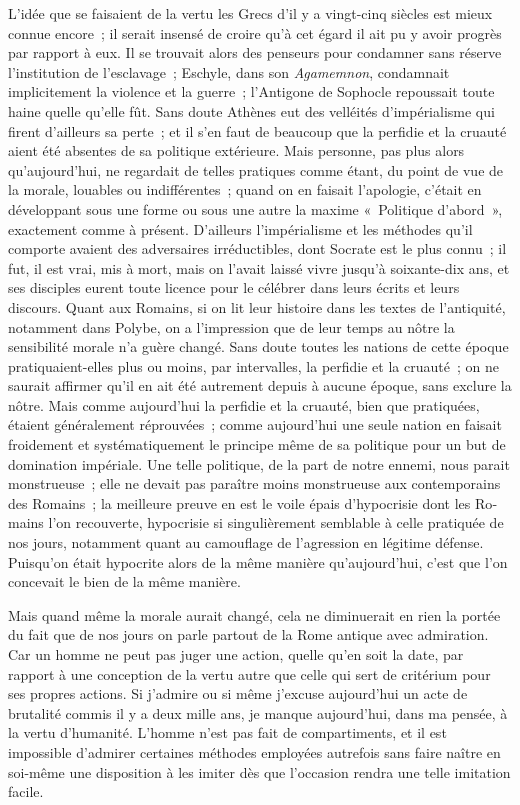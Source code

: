 \documentclass[french,twoside]{book} %
\begin{document}
L'idée que se faisaient de la vertu les Grecs d'il y a vingt-cinq siècles est mieux connue encore ; il serait insensé de croire qu'à cet égard il ait pu y avoir progrès par rapport à eux. Il se trouvait alors des penseurs pour condamner sans réserve l'institution de l'esclavage ; Eschyle, dans son {\itshape Agamemnon}, con­damnait implicitement la violence et la guerre ; l'Antigone de Sophocle repoussait toute haine quelle qu'elle fût. Sans doute Athènes eut des velléités d'impérialisme qui firent d'ailleurs sa perte ; et il s'en faut de beaucoup que la perfidie et la cruauté aient été absentes de sa politique extérieure. Mais per­sonne, pas plus alors qu'aujourd'hui, ne regardait de telles pratiques comme étant, du point de vue de la morale, louables ou indifférentes ; quand on en faisait l'apologie, c'était en développant sous une forme ou sous une autre la maxime « Politique d'abord », exactement comme à présent. D'ailleurs l'impé­rialisme et les méthodes qu'il comporte avaient des adversaires irréductibles, dont Socrate est le plus connu ; il fut, il est vrai, mis à mort, mais on l'avait laissé vivre jusqu'à soixante-dix ans, et ses disciples eurent toute licence pour le célébrer dans leurs écrits et leurs discours. Quant aux Romains, si on lit leur histoire dans les textes de l'antiquité, notamment dans Polybe, on a l'impres­sion que de leur temps au nôtre la sensibilité morale n'a guère changé. Sans doute toutes les nations de cette époque pratiquaient-elles plus ou moins, par intervalles, la perfidie et la cruauté ; on ne saurait affirmer qu'il en ait été autrement depuis à aucune époque, sans exclure la nôtre. Mais comme aujourd'hui la perfidie et la cruauté, bien que pratiquées, étaient généralement réprouvées ; comme aujourd'hui une seule nation en faisait froidement et systématiquement le principe même de sa politique pour un but de domination impériale. Une telle politique, de la part de notre ennemi, nous parait mons­trueuse ; elle ne devait pas paraître moins monstrueuse aux contemporains des Romains ; la meilleure preuve en est le voile épais d'hypocrisie dont les Ro­mains l'on recouverte, hypocrisie si singulièrement semblable à celle pratiquée de nos jours, notamment quant au camouflage de l'agression en légitime défense. Puisqu'on était hypocrite alors de la même manière qu'aujourd'hui, c'est que l'on concevait le bien de la même manière.\par
Mais quand même la morale aurait changé, cela ne diminuerait en rien la portée du fait que de nos jours on parle partout de la Rome antique avec admiration. Car un homme ne peut pas juger une action, quelle qu'en soit la date, par rapport à une conception de la vertu autre que celle qui sert de critérium pour ses propres actions. Si j'admire ou si même j'excuse aujourd'hui un acte de brutalité commis il y a deux mille ans, je manque aujourd'hui, dans ma pensée, à la vertu d'humanité. L'homme n'est pas fait de compartiments, et il est impossible d'admirer certaines méthodes employées autrefois sans faire naître en soi-même une disposition à les imiter dès que l'occasion rendra une telle imitation facile.\par
\end{document}

